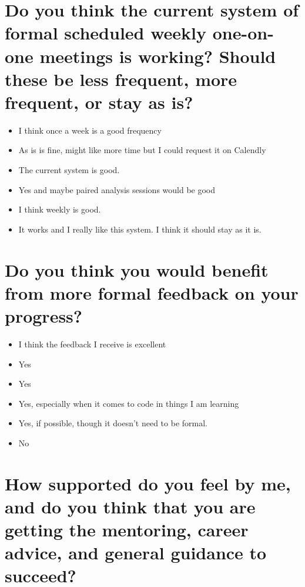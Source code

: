 \documentclass[
]{book}
\providecommand{\tightlist}{%
  \setlength{\itemsep}{0pt}\setlength{\parskip}{0pt}}
\begin{document}
\hypertarget{do-you-think-the-current-system-of-formal-scheduled-weekly-one-on-one-meetings-is-working-should-these-be-less-frequent-more-frequent-or-stay-as-is}{%
\section{Do you think the current system of formal scheduled weekly one-on-one meetings is working? Should these be less frequent, more frequent, or stay as is?}\label{do-you-think-the-current-system-of-formal-scheduled-weekly-one-on-one-meetings-is-working-should-these-be-less-frequent-more-frequent-or-stay-as-is}}

\begin{itemize}
\tightlist
\item
  I think once a week is a good frequency
\item
  As is is fine, might like more time but I could request it on Calendly
\item
  The current system is good.
\item
  Yes and maybe paired analysis sessions would be good
\item
  I think weekly is good.
\item
  It works and I really like this system. I think it should stay as it is.
\end{itemize}

\hypertarget{do-you-think-you-would-benefit-from-more-formal-feedback-on-your-progress}{%
\section{Do you think you would benefit from more formal feedback on your progress?}\label{do-you-think-you-would-benefit-from-more-formal-feedback-on-your-progress}}

\begin{itemize}
\tightlist
\item
  I think the feedback I receive is excellent
\item
  Yes
\item
  Yes
\item
  Yes, especially when it comes to code in things I am learning
\item
  Yes, if possible, though it doesn't need to be formal.
\item
  No
\end{itemize}

\hypertarget{how-supported-do-you-feel-by-me-and-do-you-think-that-you-are-getting-the-mentoring-career-advice-and-general-guidance-to-succeed}{%
\section{How supported do you feel by me, and do you think that you are getting the mentoring, career advice, and general guidance to succeed?}\label{how-supported-do-you-feel-by-me-and-do-you-think-that-you-are-getting-the-mentoring-career-advice-and-general-guidance-to-succeed}}
\end{document}
